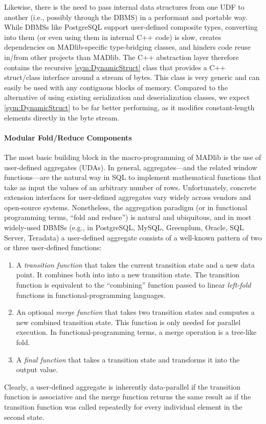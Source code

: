 Likewise, there is the need to pass internal data structures from one UDF to another (i.e., possibly through the DBMS) in a performant and portable way. While DBMSs like PostgreSQL support user-defined composite types, converting into them (or even using them in internal C++ code) is slow, creates dependencies on MADlib-specific type-bridging classes, and hinders code reuse in/from other projects than MADlib. The C++ abstraction layer therefore contains the recursive \ref{sym:DynamicStruct} class that provides a C++ struct/class interface around a stream of bytes. This class is very generic and can easily be used with any contiguous blocks of memory. Compared to the alternative of using existing serialization and deserialization classes, we expect \ref{sym:DynamicStruct} to be far better performing, as it modifies constant-length elements directly in the byte stream.

\paragraph{Modular Fold/Reduce Components}

The most basic building block in the macro-programming of MADlib is the use of user-defined aggregates (UDAs). In general, aggregates---and the related window functions---are the natural way in SQL to implement mathematical functions that take as input the values of an arbitrary number of rows. Unfortunately, concrete extension interfaces for user-defined aggregates vary widely across vendors and open-source systems. Nonetheless, the aggregation paradigm (or in functional programming terms, ``fold and reduce'') is natural and ubiquitous, and in most widely-used DBMSs (e.g., in PostgreSQL, MySQL, Greenplum, Oracle, SQL Server, Teradata) a user-defined aggregate consists of a well-known pattern of two or three user-defined functions:
\begin{enumerate}
	\item A \emph{transition function} that takes the current transition state and a new data point. It combines both into into a new transition state. The transition function is equivalent to the ``combining'' function passed to linear \emph{left-fold} functions in functional-programming languages.
	\item An optional \emph{merge function} that takes two transition states and computes a new combined transition state. This function is only needed for parallel execution. In functional-programming terms, a merge operation is a tree-like fold.
	\item A \emph{final function} that takes a transition state and transforms it into the output value.
\end{enumerate}
Clearly, a user-defined aggregate is inherently data-parallel if the transition function is associative and the merge function returns the same result as if the transition function was called repeatedly for every individual element in the second state.

